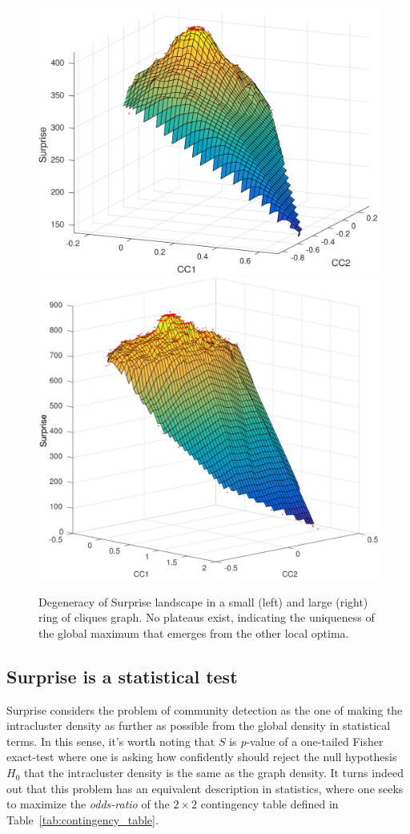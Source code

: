 \begin{figure}[ht]
\centering
\includegraphics[height=0.4\textwidth]{images/degeneracy_surprise_n_5_c_24.png}\hfill
\includegraphics[height=0.4\textwidth]{images/degeneracy_surprise_n6_c30.png}
\caption{Degeneracy of Surprise landscape in a small (left) and large (right) ring of cliques graph. No plateaus exist, indicating the uniqueness of the global maximum that emerges from the other local optima.}
\label{fig:degeneracy_surprise}
\end{figure}

\subsection{Surprise is a statistical test}\label{sec:surprisefishertest}
Surprise considers the problem of community detection as the one of making the intracluster density as further as possible from the global density in statistical terms. In this sense, it's worth noting that $S$ is \emph{p}-value of a one-tailed Fisher exact-test where one is asking how confidently should reject the null hypothesis $H_0$ that the intracluster density is the same as the graph density.
It turns indeed out that this problem has an equivalent description in statistics, where one seeks to maximize the \emph{odds-ratio} of the $2 \times 2$ contingency table defined in Table~\ref{tab:contingency_table}.

